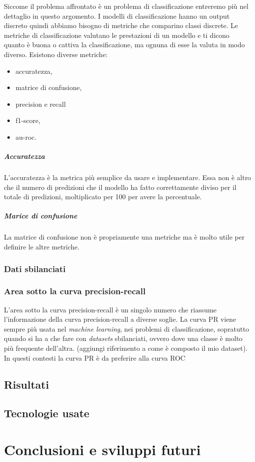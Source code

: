 \documentclass[12pt,italian]{report}
\begin{document}
	Siccome il problema affrontato è un problema di classificazione entreremo più nel dettaglio in questo argomento. I modelli di classificazione hanno un output discreto quindi abbiamo bisogno di metriche che comparino classi discrete. Le metriche di classificazione valutano le prestazioni di un modello e ti dicono quanto è buona o cattiva la classificazione, ma ognuna di esse la valuta in modo diverso.
	Esistono diverse metriche:
	\begin{itemize}
		\item accuratezza,
		\item matrice di confusione,
		\item precision e recall
		\item f1-score,
		\item au-roc.
	\end{itemize}
	\paragraph{Accuratezza}
	L'accuratezza è la metrica più semplice da usare e implementare. Essa non è altro che il numero di predizioni che il modello ha fatto correttamente diviso per il totale di predizioni, moltiplicato per 100 per avere la percentuale.
	
	\paragraph{Marice di confusione}
	La matrice di confusione non è propriamente una metriche ma è molto utile per definire le altre metriche.
	
	\subsection{Dati sbilanciati}
	\subsection{Area sotto la curva precision-recall}
	
	
	L'area sotto la curva precision-recall è un singolo numero che riassume l'informazione della curva precision-recall a diverse soglie. La curva PR viene sempre più usata nel \textit{machine learning}, nei problemi di classificazione, sopratutto quando si ha a che fare con \textit{datasets} sbilanciati, ovvero dove una classe è molto più frequente dell'altra. (aggiungi riferimento a come è composto il mio dataset). In questi contesti la curva PR è da preferire alla curva ROC 
	
	\section{Risultati}
	
	\section{Tecnologie usate}
	
	\chapter{Conclusioni e sviluppi futuri}
	
	\nocite{smlbook}
	\nocite{Kingsford2008}
	
	
	
\end{document}
